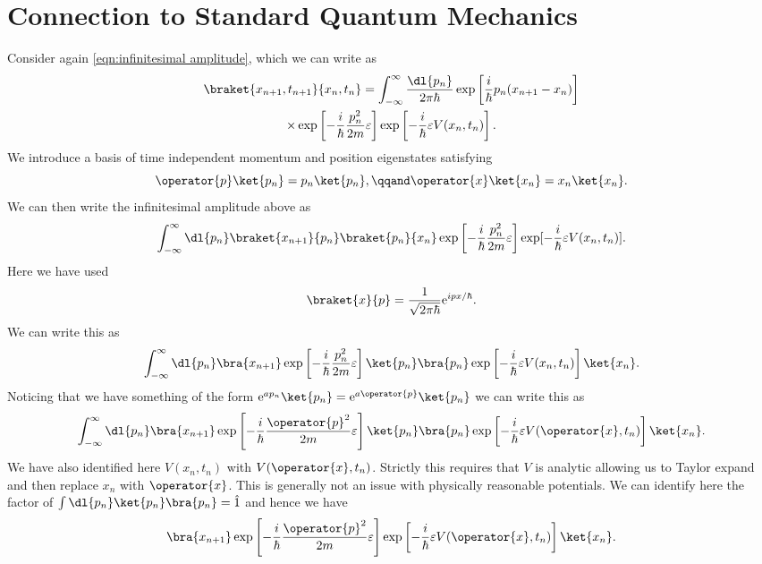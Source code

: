\documentclass[fleqn]{NotesClass}
\newcommand*{\e}{\mathrm{e}}
\newcommand*{\idop}{\hat{1}}
\begin{document}
    \chapter{Connection to Standard Quantum Mechanics}
    Consider again \cref{eqn:infinitesimal amplitude}, which we can write as
    \begin{multline}
        \braket{x_{n+1}, t_{n+1}}{x_n, t_n} = \int_{-\infty}^{\infty} \frac{\dl{p_n}}{2\pi\hbar} \exp\left[ \frac{i}{\hbar}p_n(x_{n+1} - x_n) \right]\\
        \times \exp\left[ -\frac{i}{\hbar}\frac{p_n^2}{2m}\varepsilon \right] \exp\left[ -\frac{i}{\hbar}\varepsilon V(x_n, t_n) \right].
    \end{multline}
    We introduce a basis of time independent momentum and position eigenstates satisfying
    \begin{equation}
        \operator{p}\ket{p_n} = p_n\ket{p_n}, \qqand \operator{x}\ket{x_n} = x_n\ket{x_n}.
    \end{equation}
    We can then write the infinitesimal amplitude above as
    \begin{equation}
        \int_{-\infty}^{\infty} \dl{p_n} \braket{x_{n+1}}{p_n}\braket{p_n}{x_n} \exp\left[ -\frac{i}{\hbar}\frac{p_n^2}{2m}\varepsilon \right] \exp[-\frac{i}{\hbar}\varepsilon V(x_n, t_n)].
    \end{equation}
    Here we have used
    \begin{equation}
        \braket{x}{p} = \frac{1}{\sqrt{2\pi\hbar}}\e^{ipx/\hbar}.
    \end{equation}
    We can write this as
    \begin{equation}
        \int_{-\infty}^{\infty}  \dl{p_n} \bra{x_{n+1}} \exp\left[ -\frac{i}{\hbar}\frac{p_n^2}{2m}\varepsilon \right] \ket{p_n}\bra{p_n} \exp\left[ -\frac{i}{\hbar} \varepsilon V(x_n, t_n) \right] \ket{x_n}.
    \end{equation}
    Noticing that we have something of the form \(\e^{ap_n}\ket{p_n} = \e^{a\operator{p}}\ket{p_n}\) we can write this as
    \begin{equation}
        \int_{-\infty}^{\infty}  \dl{p_n} \bra{x_{n+1}} \exp\left[ -\frac{i}{\hbar}\frac{\operator{p}^2}{2m}\varepsilon \right] \ket{p_n}\bra{p_n} \exp\left[ -\frac{i}{\hbar} \varepsilon V(\operator{x}, t_n) \right] \ket{x_n}.
    \end{equation}
    We have also identified here \(V(x_n, t_n)\) with \(V(\operator{x}, t_n)\).
    Strictly this requires that \(V\) is analytic allowing us to Taylor expand and then replace \(x_n\) with \(\operator{x}\).
    This is generally not an issue with physically reasonable potentials.
    We can identify here the factor of \(\int \dl{p_n} \ket{p_n}\bra{p_n} = \idop\) and hence we have
    \begin{equation}
        \bra{x_{n+1}} \exp\left[ -\frac{i}{\hbar}\frac{\operator{p}^2}{2m}\varepsilon \right] \exp\left[ -\frac{i}{\hbar} \varepsilon V(\operator{x}, t_n) \right] \ket{x_n}.
    \end{equation}
    
\end{document}
